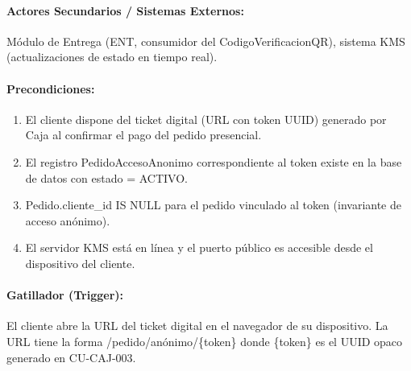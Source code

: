\paragraph{Actores Secundarios / Sistemas Externos:} Módulo de Entrega (ENT, consumidor del CodigoVerificacionQR), sistema KMS (actualizaciones de estado en tiempo real).

\paragraph{Precondiciones:}
\begin{enumerate}
    \item[I.] El cliente dispone del ticket digital (URL con token UUID) generado por Caja al confirmar el pago del pedido presencial.
    \item[II.] El registro PedidoAccesoAnonimo correspondiente al token existe en la base de datos con estado = ACTIVO.
    \item[III.] Pedido.cliente\_id IS NULL para el pedido vinculado al token (invariante de acceso anónimo).
    \item[IV.] El servidor KMS está en línea y el puerto público es accesible desde el dispositivo del cliente.
\end{enumerate}

\paragraph{Gatillador (Trigger):} El cliente abre la URL del ticket digital en el navegador de su dispositivo. La URL tiene la forma /pedido/anónimo/\{token\} donde \{token\} es el UUID opaco generado en CU-CAJ-003.

